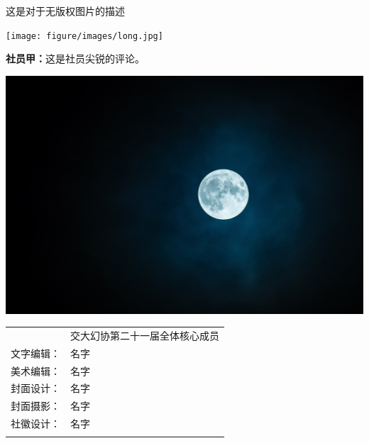 \documentclass[9pt]{book}
\begin{document}
\begin{multicols*}{2}
\raggedcolumns

\columnbreak
这是对于无版权图片的描述
\begin{center} 
    \texttt{[image: figure/images/long.jpg]}
    \label{fig:3}
\end{center}

\vspace{-1.25\baselineskip}


{\bfseries 社员甲：}这是社员尖锐的评论。


\begin{center}
    \includegraphics[width=\columnwidth]{figure/images/short.jpg}
    \label{fig:20240928-4}
\end{center}

\end{multicols*}

\clearpage
\thispagestyle{empty} %
\null
\newpage


\newpage
\thispagestyle{empty}

\vspace*{\fill}

\noindent
\begin{tabularx}{\linewidth}{@{}lX@{}}
  \begin{tabular}[c]{l @{\quad} l}
    创意策划： & 交大幻协第二十一届全体核心成员 \\
    文字编辑： & 名字 \\
    美术编辑： & 名字 \\
    封面设计： & 名字 \\
    封面摄影： & 名字 \\
    社徽设计： & 名字 \\
  \end{tabular}
  &
  \centering
   \raisebox{-12mm}{%
    \scalebox{8}{\faRocket} %
  }
\end{tabularx}

\vspace{0.5in}
\end{document}
